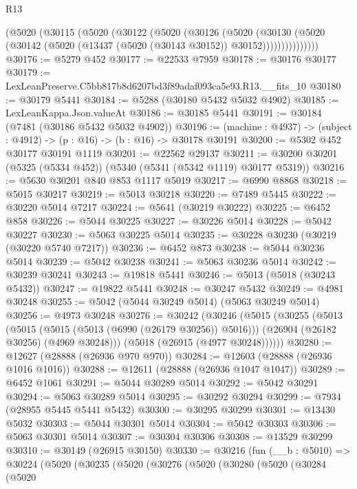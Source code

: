 \begin{lexlean}{R13}
\begin{coremodule}
          (@5020
            (@30115
              (@5020
                (@30122
                  (@5020
                    (@30126
                      (@5020
                        (@30130
                          (@5020
                            (@30142 (@5020 (@13437 (@5020 (@30143 @30152)) @30152)))))))))))))))
@30176 := @5279 @452
@30177 := @22533 @7959
@30178 := @30176 @30177
@30179 := LexLeanPreserve.C5bb817b8d6207bd3f89adaf093ca5e93.R13.__fits_10
@30180 := @30179 @5441
@30184 := @5288 (@30180 @5432 @5032 @4902)
@30185 := LexLeanKappa.Json.valueAt
@30186 := @30185 @5441
@30191 := @30184 (@7481 (@30186 @5432 @5032 @4902))
@30196 := (machine : @4937) -> (subject : @4912) -> (p : @16) -> (b : @16) -> @30178 @30191
@30200 := @5302 @452 @30177 @30191 @1119
@30201 := @22562 @29137
@30211 := @30200 @30201 (@5325 (@5334 @452)) (@5340 (@5341 (@5342 @1119) @30177 @5319))
@30216 := @5630 @30201 @840 @853 @1117 @5019
@30217 := @6990 @8868
@30218 := @5015 @30217
@30219 := @5013 @30218
@30220 := @7489 @5445
@30222 := @30220 @5014 @7217
@30224 := @5641 (@30219 @30222)
@30225 := @6452 @858
@30226 := @5044 @30225
@30227 := @30226 @5014
@30228 := @5042 @30227
@30230 := @5063 @30225 @5014
@30235 := @30228 @30230 (@30219 (@30220 @5740 @7217))
@30236 := @6452 @873
@30238 := @5044 @30236 @5014
@30239 := @5042 @30238
@30241 := @5063 @30236 @5014
@30242 := @30239 @30241
@30243 := @19818 @5441
@30246 := @5013 (@5018 (@30243 @5432))
@30247 := @19822 @5441
@30248 := @30247 @5432
@30249 := @4981 @30248
@30255 := @5042 (@5044 @30249 @5014) (@5063 @30249 @5014)
@30256 := @4973 @30248
@30276 := @30242
    (@30246
      (@5015
        (@30255
          (@5013
            (@5015 (@5015 (@5013 (@6990 (@26179 @30256)) @5016)))
            (@26904 (@26182 @30256) (@4969 @30248)))
          (@5018 (@26915 (@4977 @30248))))))
@30280 := @12627 (@28888 (@26936 @970 @970))
@30284 := @12603 (@28888 (@26936 @1016 @1016))
@30288 := @12611 (@28888 (@26936 @1047 @1047))
@30289 := @6452 @1061
@30291 := @5044 @30289 @5014
@30292 := @5042 @30291
@30294 := @5063 @30289 @5014
@30295 := @30292 @30294
@30299 := @7934 (@28955 @5445 @5441 @5432)
@30300 := @30295 @30299
@30301 := @13430 @5032
@30303 := @5044 @30301 @5014
@30304 := @5042 @30303
@30306 := @5063 @30301 @5014
@30307 := @30304 @30306
@30308 := @13529 @30299
@30310 := @30149 (@26915 @30150)
@30330 := @30216
    (fun (__b : @5010) =>
    @30224
      (@5020
        (@30235
          (@5020
            (@30276
              (@5020
                (@30280
                  (@5020
                    (@30284
                      (@5020

\end{coremodule}
\end{lexlean}
